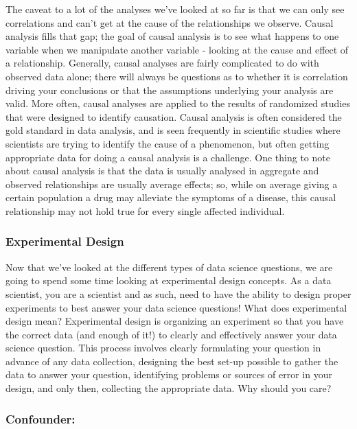 \documentclass[
]{book}
\begin{document}
The caveat to a lot of the analyses we've looked at so far is that we can only see correlations and can't get at the cause of the relationships we observe. Causal analysis fills that gap; the goal of causal analysis is to see what happens to one variable when we manipulate another variable - looking at the cause and effect of a relationship.
Generally, causal analyses are fairly complicated to do with observed data alone; there will always be questions as to whether it is correlation driving your conclusions or that the assumptions underlying your analysis are valid. More often, causal analyses are applied to the results of randomized studies that were designed to identify causation. Causal analysis is often considered the gold standard in data analysis, and is seen frequently in scientific studies where scientists are trying to identify the cause of a phenomenon, but often getting appropriate data for doing a causal analysis is a challenge.
One thing to note about causal analysis is that the data is usually analysed in aggregate and observed relationships are usually average effects; so, while on average giving a certain population a drug may alleviate the symptoms of a disease, this causal relationship may not hold true for every single affected individual.

\hypertarget{experimental-design}{%
\subsubsection{Experimental Design}\label{experimental-design}}

Now that we've looked at the different types of data science questions, we are going to spend some time looking at experimental design concepts. As a data scientist, you are a scientist and as such, need to have the ability to design proper experiments to best answer your data science questions!
What does experimental design mean?
Experimental design is organizing an experiment so that you have the correct data (and enough of it!) to clearly and effectively answer your data science question. This process involves clearly formulating your question in advance of any data collection, designing the best set-up possible to gather the data to answer your question, identifying problems or sources of error in your design, and only then, collecting the appropriate data.
Why should you care?

\hypertarget{confounder}{%
\subsubsection{Confounder:}\label{confounder}}
\end{document}
